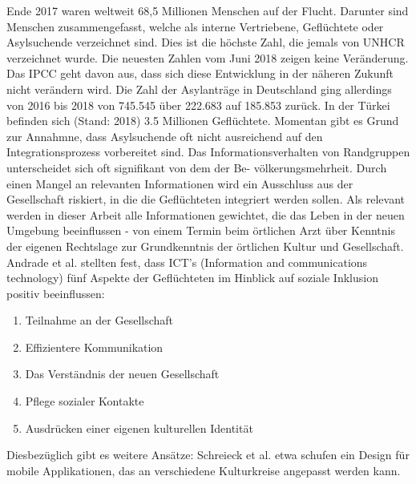 \documentclass[12pt,oneside]{article}
\begin{document}
Ende 2017 waren weltweit 68,5 Millionen Menschen auf der Flucht. Darunter sind Menschen zusammengefasst, welche als interne Vertriebene, Gefl\"uchtete oder Asylsuchende verzeichnet sind. Dies ist die h\"ochste Zahl, die jemals von UNHCR verzeichnet wurde.\cite{uno2018flucht}
Die neuesten Zahlen vom Juni 2018 zeigen keine Ver\"anderung. \cite{uno2018flucht}
Das IPCC geht davon aus, dass sich diese Entwicklung in der n\"aheren Zukunft nicht ver\"andern wird. \cite{sr15ipcc}\newline
Die Zahl der Asylantr\"age in Deutschland ging allerdings von 2016 bis 2018 von 745.545 \"uber 222.683 auf 185.853 zur\"uck. \cite{statistica2019asyl} In der T\"urkei befinden sich (Stand: 2018) 3.5 Millionen Gefl\"uchtete.\newline
\newline
Momentan gibt es Grund zur Annahmne, dass Asylsuchende oft nicht ausreichend auf den Integrationsprozess vorbereitet sind. \cite{oduntan2017information} \cite{gillespie2016mapping}\newline
Das Informationsverhalten von Randgruppen unterscheidet sich oft signifikant von dem der Be- v\"olkerungsmehrheit. \cite{chatman1996impoverished}
Durch einen Mangel an relevanten Informationen wird ein Ausschluss aus der Gesellschaft riskiert, in die die Gefl\"uchteten integriert werden sollen. \cite{andrade2016information}\newline
Als relevant werden in dieser Arbeit alle Informationen gewichtet, die das Leben in der neuen Umgebung beeinflussen - von einem Termin beim \"ortlichen Arzt \"uber Kenntnis der eigenen Rechtslage zur Grundkenntnis der \"ortlichen Kultur und Gesellschaft. \cite{schreieck2017supporting}\newline
Andrade et al. stellten fest, dass ICT's (Information and communications technology) f\"unf Aspekte der Gefl\"uchteten im Hinblick auf soziale Inklusion positiv beeinflussen:
\begin{enumerate}
    \item   Teilnahme an der Gesellschaft
    \item   Effizientere Kommunikation
    \item   Das Verst\"andnis der neuen Gesellschaft
    \item   Pflege sozialer Kontakte
    \item   Ausdr\"ucken einer eigenen kulturellen Identit\"at
\end{enumerate}
Diesbez\"uglich gibt es weitere Ans\"atze:\newline
Schreieck et al. etwa schufen ein Design f\"ur mobile Applikationen, das an verschiedene Kulturkreise angepasst werden kann. \cite{schreieck2017supporting}\newline
\end{document}
